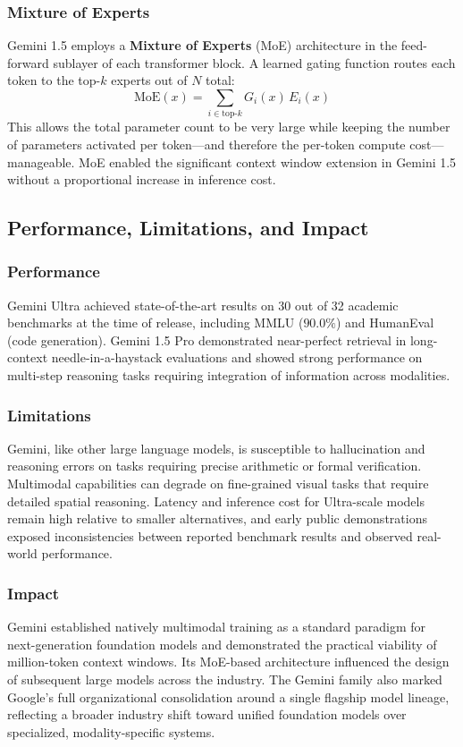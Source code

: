 \documentclass[11pt,a4paper]{report}
\begin{document}
\subsubsection{Mixture of Experts}
Gemini 1.5 employs a \textbf{Mixture of Experts} (MoE) architecture in the feed-forward sublayer of each
transformer block. A learned gating function routes each token to the top-$k$ experts out of $N$ total:
\[
\text{MoE}(x) = \sum_{i \in \text{top-}k} G_i(x)\, E_i(x)
\]
This allows the total parameter count to be very large while keeping the number of parameters activated per
token---and therefore the per-token compute cost---manageable. MoE enabled the significant context window
extension in Gemini 1.5 without a proportional increase in inference cost.

\subsection{Performance, Limitations, and Impact}

\subsubsection{Performance}
Gemini Ultra achieved state-of-the-art results on 30 out of 32 academic benchmarks at the time of release,
including MMLU ($90.0\%$) and HumanEval (code generation). Gemini 1.5 Pro demonstrated near-perfect retrieval
in long-context needle-in-a-haystack evaluations and showed strong performance on multi-step reasoning tasks
requiring integration of information across modalities.

\subsubsection{Limitations}
Gemini, like other large language models, is susceptible to hallucination and reasoning errors on tasks
requiring precise arithmetic or formal verification. Multimodal capabilities can degrade on fine-grained visual
tasks that require detailed spatial reasoning. Latency and inference cost for Ultra-scale models remain high
relative to smaller alternatives, and early public demonstrations exposed inconsistencies between reported
benchmark results and observed real-world performance.

\subsubsection{Impact}
Gemini established natively multimodal training as a standard paradigm for next-generation foundation models
and demonstrated the practical viability of million-token context windows. Its MoE-based architecture influenced
the design of subsequent large models across the industry. The Gemini family also marked Google's full
organizational consolidation around a single flagship model lineage, reflecting a broader industry shift toward
unified foundation models over specialized, modality-specific systems.
\end{document}
